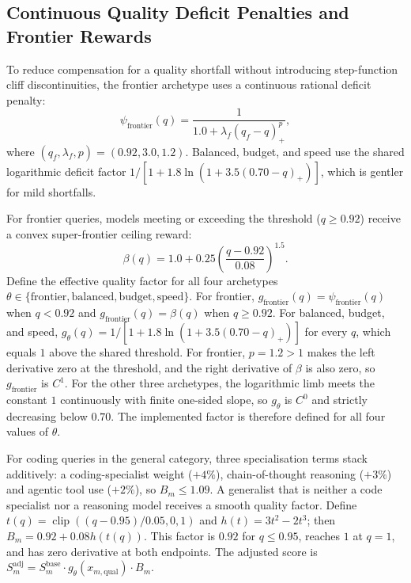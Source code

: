 \documentclass[pdflatex,sn-mathphys-num]{sn-jnl}
\theoremstyle{thmstyleone}
\theoremstyle{thmstylethree}
\begin{document}
\subsection{Continuous Quality Deficit Penalties and Frontier Rewards}\label{subsec:deficits}

To reduce compensation for a quality shortfall without introducing step-function cliff discontinuities, the frontier archetype uses a continuous rational deficit penalty:
\begin{equation}\label{eq:deficit_penalty}
\psi_{\text{frontier}}(q) = \frac{1}{1.0 + \lambda_f (q_f - q)_+^p},
\end{equation}
where $(q_f, \lambda_f, p) = (0.92, 3.0, 1.2)$. Balanced, budget, and speed use the shared logarithmic deficit factor $1/[1 + 1.8\ln(1 + 3.5(0.70-q)_+)]$, which is gentler for mild shortfalls.

For frontier queries, models meeting or exceeding the threshold ($q \ge 0.92$) receive a convex super-frontier ceiling reward:
\begin{equation}\label{eq:frontier_reward}
\beta(q) = 1.0 + 0.25 \left( \frac{q - 0.92}{0.08} \right)^{1.5}.
\end{equation}
Define the effective quality factor for all four archetypes $\theta\in\{\text{frontier},\text{balanced},\text{budget},\text{speed}\}$. For frontier, $g_{\text{frontier}}(q)=\psi_{\text{frontier}}(q)$ when $q<0.92$ and $g_{\text{frontier}}(q)=\beta(q)$ when $q\ge0.92$. For balanced, budget, and speed, $g_\theta(q)=1/[1+1.8\ln(1+3.5(0.70-q)_+)]$ for every $q$, which equals $1$ above the shared threshold. For frontier, $p=1.2>1$ makes the left derivative zero at the threshold, and the right derivative of $\beta$ is also zero, so $g_{\text{frontier}}$ is $C^1$. For the other three archetypes, the logarithmic limb meets the constant $1$ continuously with finite one-sided slope, so $g_\theta$ is $C^0$ and strictly decreasing below $0.70$. The implemented factor is therefore defined for all four values of $\theta$.

For coding queries in the general category, three specialisation terms stack additively: a coding-specialist weight ($+4\%$), chain-of-thought reasoning ($+3\%$) and agentic tool use ($+2\%$), so $B_m \le 1.09$. A generalist that is neither a code specialist nor a reasoning model receives a smooth quality factor. Define $t(q)=\operatorname{clip}((q-0.95)/0.05,0,1)$ and $h(t)=3t^2-2t^3$; then $B_m=0.92+0.08h(t(q))$. This factor is $0.92$ for $q\leq0.95$, reaches $1$ at $q=1$, and has zero derivative at both endpoints. The adjusted score is $S_m^{\text{adj}} = S_m^{\text{base}} \cdot g_\theta(x_{m, \text{qual}}) \cdot B_m$.
\end{document}
